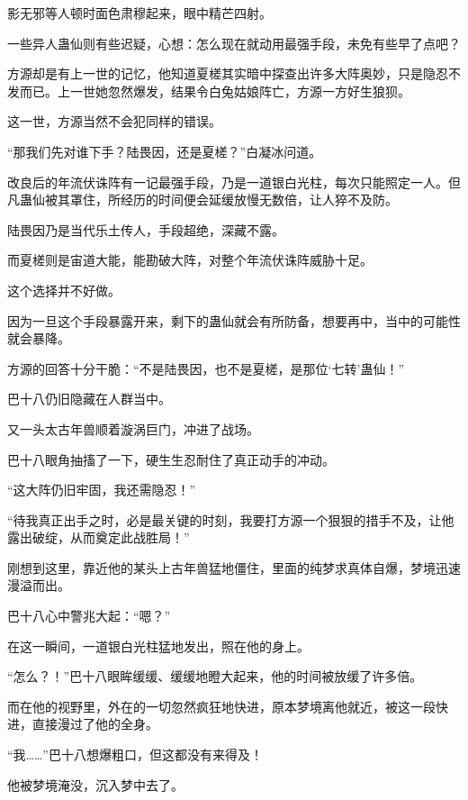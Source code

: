 
\begin{this_body}



影无邪等人顿时面色肃穆起来，眼中精芒四射。

一些异人蛊仙则有些迟疑，心想：怎么现在就动用最强手段，未免有些早了点吧？

方源却是有上一世的记忆，他知道夏槎其实暗中探查出许多大阵奥妙，只是隐忍不发而已。上一世她忽然爆发，结果令白兔姑娘阵亡，方源一方好生狼狈。

这一世，方源当然不会犯同样的错误。

“那我们先对谁下手？陆畏因，还是夏槎？”白凝冰问道。

改良后的年流伏诛阵有一记最强手段，乃是一道银白光柱，每次只能照定一人。但凡蛊仙被其罩住，所经历的时间便会延缓放慢无数倍，让人猝不及防。

陆畏因乃是当代乐土传人，手段超绝，深藏不露。

而夏槎则是宙道大能，能勘破大阵，对整个年流伏诛阵威胁十足。

这个选择并不好做。

因为一旦这个手段暴露开来，剩下的蛊仙就会有所防备，想要再中，当中的可能性就会暴降。

方源的回答十分干脆：“不是陆畏因，也不是夏槎，是那位‘七转’蛊仙！”

巴十八仍旧隐藏在人群当中。

又一头太古年兽顺着漩涡巨门，冲进了战场。

巴十八眼角抽搐了一下，硬生生忍耐住了真正动手的冲动。

“这大阵仍旧牢固，我还需隐忍！”

“待我真正出手之时，必是最关键的时刻，我要打方源一个狠狠的措手不及，让他露出破绽，从而奠定此战胜局！”

刚想到这里，靠近他的某头上古年兽猛地僵住，里面的纯梦求真体自爆，梦境迅速漫溢而出。

巴十八心中警兆大起：“嗯？”

在这一瞬间，一道银白光柱猛地发出，照在他的身上。

“怎么？！”巴十八眼眸缓缓、缓缓地瞪大起来，他的时间被放缓了许多倍。

而在他的视野里，外在的一切忽然疯狂地快进，原本梦境离他就近，被这一段快进，直接漫过了他的全身。

“我……”巴十八想爆粗口，但这都没有来得及！

他被梦境淹没，沉入梦中去了。


\end{this_body}
